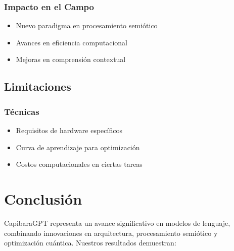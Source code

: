 \documentclass[12pt,a4paper]{article}
\begin{document}
\subsubsection{Impacto en el Campo}
\begin{itemize}
    \item Nuevo paradigma en procesamiento semiótico
    \item Avances en eficiencia computacional
    \item Mejoras en comprensión contextual
\end{itemize}

\subsection{Limitaciones}

\subsubsection{Técnicas}
\begin{itemize}
    \item Requisitos de hardware específicos
    \item Curva de aprendizaje para optimización
    \item Costos computacionales en ciertas tareas
\end{itemize}

\section{Conclusión}

CapibaraGPT representa un avance significativo en modelos de lenguaje, combinando innovaciones en arquitectura, procesamiento semiótico y optimización cuántica. Nuestros resultados demuestran:
\end{document}
